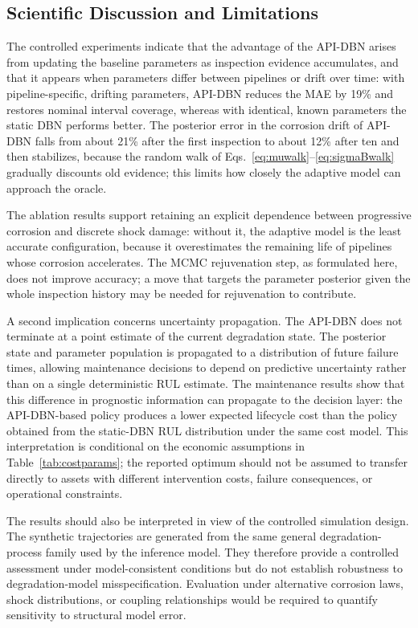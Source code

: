 \documentclass[journal]{IEEEtran}
\begin{document}
\subsection{Scientific Discussion and Limitations}
\label{sec:discussion}

The controlled experiments indicate that the advantage of the API-DBN
arises from updating the baseline parameters as inspection evidence
accumulates, and that it appears when parameters differ between
pipelines or drift over time: with pipeline-specific, drifting
parameters, API-DBN reduces the MAE by 19\% and restores nominal
interval coverage, whereas with identical, known parameters the static
DBN performs better. The posterior error in the corrosion drift of
API-DBN falls from about 21\% after the first inspection to about 12\%
after ten and then stabilizes, because the random walk of
Eqs.~\eqref{eq:muwalk}--\eqref{eq:sigmaBwalk} gradually discounts old
evidence; this limits how closely the adaptive model can approach the
oracle.

The ablation results support retaining an explicit dependence between
progressive corrosion and discrete shock damage: without it, the
adaptive model is the least accurate configuration, because it
overestimates the remaining life of pipelines whose corrosion
accelerates. The MCMC rejuvenation step, as formulated here, does not
improve accuracy; a move that targets the parameter posterior given the
whole inspection history \cite{gilks2001} may be needed for
rejuvenation to contribute.

A second implication concerns uncertainty propagation. The API-DBN
does not terminate at a point estimate of the current degradation
state. The posterior state and parameter population is propagated to
a distribution of future failure times, allowing maintenance decisions
to depend on predictive uncertainty rather than on a single
deterministic RUL estimate. The maintenance results show that this
difference in prognostic information can propagate to the
decision layer: the API-DBN-based policy produces a lower expected
lifecycle cost than the policy obtained from the static-DBN RUL
distribution under the same cost model. This interpretation is
conditional on the economic assumptions in
Table~\ref{tab:costparams}; the reported optimum should not be assumed
to transfer directly to assets with different intervention costs,
failure consequences, or operational constraints.

The results should also be interpreted in view of the controlled
simulation design. The synthetic trajectories are generated from the
same general degradation-process family used by the inference model.
They therefore provide a controlled assessment under model-consistent
conditions but do not establish robustness to degradation-model
misspecification. Evaluation under alternative corrosion laws, shock
distributions, or coupling relationships would be required to
quantify sensitivity to structural model error.
\end{document}
